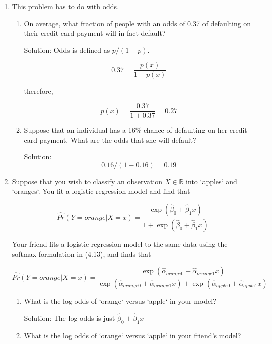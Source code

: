 \documentclass{article}
\begin{document}
\begin{enumerate}
Solution: For $K = 1$, performance on the training set is perfect and the error rate
is zero, implying a test error rate of 36\%. Logistic regression outperforms
1-nearest neighbor on the test set and therefore should be preferred.

\item This problem has to do with odds.

\begin{enumerate}
\item On average, what fraction of people with an odds of 0.37 of defaulting on
    their credit card payment will in fact default?

Solution: Odds is defined as $p/(1-p)$.

$$0.37 = \frac{p(x)}{1 - p(x)}$$

therefore,

$$p(x) = \frac{0.37}{1 + 0.37} = 0.27$$

\item Suppose that an individual has a 16\% chance of defaulting on her credit
    card payment. What are the odds that she will default?

Solution:$$0.16 / (1 - 0.16)  = 0.19$$

\end{enumerate}

\item Suppose that you wish to classify an observation $X \in \mathbb{R}$ into 
 `apples` and `oranges`. You fit a logistic regression model and find that

 $$
 \hat{Pr}(Y=orange|X=x) = 
 \frac{\exp(\hat\beta_0 + \hat\beta_1x)}{1 + \exp(\hat\beta_0 + \hat\beta_1x)}
 $$

 Your friend fits a logistic regression model to the same data using the
 softmax formulation in (4.13), and finds that

 $$
 \hat{Pr}(Y=orange|X=x) = 
 \frac{\exp(\hat\alpha_{orange0} + \hat\alpha_{orange1}x)}
 {\exp(\hat\alpha_{orange0} + \hat\alpha_{orange1}x) + \exp(\hat\alpha_{apple0} + \hat\alpha_{apple1}x)}
 $$
 
\begin{enumerate}
\item What is the log odds of `orange` versus `apple` in your model?

Solution: The log odds is just $\hat\beta_0 + \hat\beta_1x$

\item What is the log odds of `orange` versus `apple` in your friend's model?


\end{enumerate}
\end{enumerate}
\end{document}
